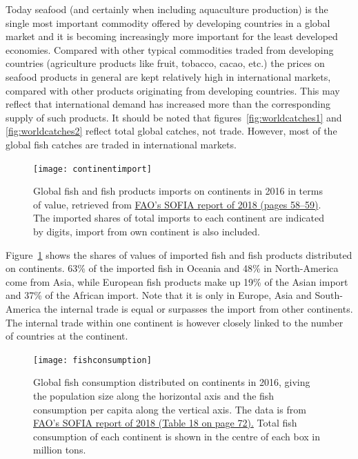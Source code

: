 \documentclass[11pt,fleqn]{book} %
\begin{document}
Today seafood (and certainly when including aquaculture production) is the single most important commodity offered by developing countries in a global market\cite{FoodandAgricultureOrganizationoftheUnitedNations.FisheriesandAquacultureDepartment2018} and it is becoming increasingly more important for the least developed economies. Compared with other typical commodities traded from developing countries (agriculture products like fruit, tobacco, cacao, etc.) the prices on seafood products in general are kept relatively high in international markets, compared with other products originating from developing countries. This may reflect that international demand has increased more than the corresponding supply of such products. It should be noted that figures~\ref{fig:worldcatches1} and \ref{fig:worldcatches2} reflect total global catches, not trade. However, most of the global fish catches are traded in international markets.

\begin{figure}[ht]
\centering
\texttt{[image: continentimport]}
\caption{Global fish and fish products imports on continents in 2016 in terms of value, retrieved from \href{javascript:new_window(http://www.fao.org/documents/card/en/c/I9540EN)}{FAO's SOFIA report of 2018 (pages 58--59)}. The imported shares of total imports to each continent are indicated by digits, import from own continent is also included.}
\label{fig:worldcatches3}
\end{figure}

Figure~\ref{fig:worldcatches3} shows the shares of values of imported fish and fish products distributed on continents. 63\% of the imported fish in Oceania and 48\% in North-America come from Asia, while European fish products make up 19\% of the Asian import and 37\% of the African import. Note that it is only in Europe, Asia and South-America the internal trade is equal or surpasses the import from other continents. The internal trade within one continent is however closely linked to the number of countries at the continent.

\begin{figure}[ht]
\flushleft
\texttt{[image: fishconsumption]}
\caption{Global fish consumption distributed on continents in 2016, giving the population size along the horizontal axis and the fish consumption per capita along the vertical axis. The data is from \href{javascript:new_window(http://www.fao.org/documents/card/en/c/I9540EN)}{FAO's SOFIA report of 2018 (Table 18 on page 72).} Total fish consumption of each continent is shown in the centre of each box in million tons.}
\label{fig:worldcatches4}
\end{figure}
\end{document}
